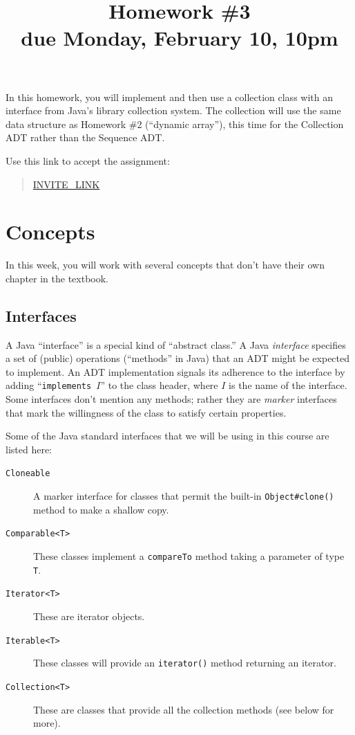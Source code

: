 \documentclass[11pt]{article}
\title[Homework \#3]{Homework \#3\\ 
\textbf{due Monday, February 10, 10pm}}
\begin{document}
\maketitle
In this homework, 
you will implement and then use a collection
class with an interface from Java's library collection system.
The collection will use the same data structure as Homework \#2
(``dynamic array''), this time for the \textsf{Collection} ADT rather than the
\textsf{Sequence} ADT.

Use this link to accept the assignment:
\begin{quote}
\url{INVITE_LINK}
\end{quote}

\section{Concepts}

In this week, you will work with several concepts that don't have
their own chapter in the textbook.

\subsection{Interfaces}

A Java ``interface'' is a special kind of ``abstract class.''
A Java \emph{interface} specifies a set of (public) operations
(``methods'' in Java) that an ADT
might be expected to implement.  An ADT implementation signals its
adherence to the interface by adding ``\texttt{implements $I$}'' 
to the class header, where
$I$ is the name of the interface.
Some interfaces don't mention any methods; 
rather they are \emph{marker} interfaces that 
mark the willingness of the class to satisfy certain properties.

Some of the Java standard interfaces that we will be using in this course are listed here:
\begin{description}
\item[\texttt{Cloneable}] A marker interface for classes that permit the built-in 
\verb|Object#clone()| method to make a shallow copy.
\item[\texttt{Comparable<T>}] These classes 
implement a \texttt{compareTo} method taking a parameter of type \texttt{T}.
\item[\texttt{Iterator<T>}] These are iterator objects.
\item[\texttt{Iterable<T>}] These classes will provide an
  \texttt{iterator()} method returning an iterator.
\item[\texttt{Collection<T>}] These are classes that provide all the collection methods 
(see below for more).
\end{description}
\end{document}
